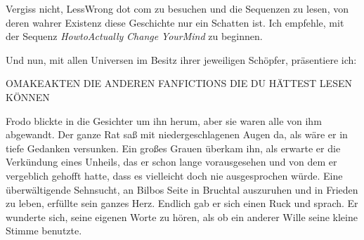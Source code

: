 \begin{chapterOpeningAuthorNote}
Vergiss nicht, LessWrong dot com zu besuchen und die Sequenzen zu lesen, von deren wahrer Existenz diese Geschichte nur ein Schatten ist. Ich empfehle, mit der Sequenz \emph{HowtoActually} \emph{Change} \emph{YourMind} zu beginnen.


Und nun, mit allen Universen im Besitz ihrer jeweiligen Schöpfer, präsentiere ich:


\end{chapterOpeningAuthorNote}


OMAKEAKTEN
DIE ANDEREN FANFICTIONS
DIE DU HÄTTEST LESEN KÖNNEN


Frodo blickte in die Gesichter um ihn herum, aber sie waren alle von ihm abgewandt. Der ganze Rat saß mit niedergeschlagenen Augen da, als wäre er in tiefe Gedanken versunken. Ein großes Grauen überkam ihn, als erwarte er die Verkündung eines Unheils, das er schon lange vorausgesehen und von dem er vergeblich gehofft hatte, dass es vielleicht doch nie ausgesprochen würde. Eine überwältigende Sehnsucht, an Bilbos Seite in Bruchtal auszuruhen und in Frieden zu leben, erfüllte sein ganzes Herz. Endlich gab er sich einen Ruck und sprach. Er wunderte sich, seine eigenen Worte zu hören, als ob ein anderer Wille seine kleine Stimme benutzte.

